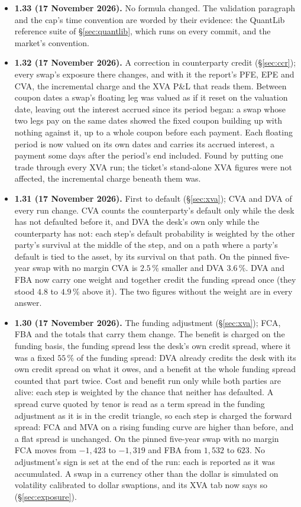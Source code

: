 \documentclass[11pt,a4paper]{article}
\begin{document}
{\begin{itemize}[leftmargin=1.4em, itemsep=4pt]
\item \textbf{1.33 (17 November 2026).} No formula changed. The validation paragraph and the cap's time convention are worded by their evidence: the QuantLib reference suite of \S\ref{sec:quantlib}, which runs on every commit, and the market's convention.
\item \textbf{1.32 (17 November 2026).} A correction in counterparty credit (\S\ref{sec:ccr}); every swap's exposure there changes, and with it the report's PFE, EPE and CVA, the incremental charge and the XVA P\&L that reads them. Between coupon dates a swap's floating leg was valued as if it reset on the valuation date, leaving out the interest accrued since its period began: a swap whose two legs pay on the same dates showed the fixed coupon building up with nothing against it, up to a whole coupon before each payment. Each floating period is now valued on its own dates and carries its accrued interest, a payment some days after the period's end included. Found by putting one trade through every XVA run; the ticket's stand-alone XVA figures were not affected, the incremental charge beneath them was.
\item \textbf{1.31 (17 November 2026).} First to default (\S\ref{sec:xva}); CVA and DVA of every run change. CVA counts the counterparty's default only while the desk has not defaulted before it, and DVA the desk's own only while the counterparty has not: each step's default probability is weighted by the other party's survival at the middle of the step, and on a path where a party's default is tied to the asset, by its survival on that path. On the pinned five-year swap with no margin CVA is $2.5\,\%$ smaller and DVA $3.6\,\%$. DVA and FBA now carry one weight and together credit the funding spread once (they stood $4.8$ to $4.9\,\%$ above it). The two figures without the weight are in every answer.
\item \textbf{1.30 (17 November 2026).} The funding adjustment (\S\ref{sec:xva}); FCA, FBA and the totals that carry them change. The benefit is charged on the funding basis, the funding spread less the desk's own credit spread, where it was a fixed $55\,\%$ of the funding spread: DVA already credits the desk with its own credit spread on what it owes, and a benefit at the whole funding spread counted that part twice. Cost and benefit run only while both parties are alive: each step is weighted by the chance that neither has defaulted. A spread curve quoted by tenor is read as a term spread in the funding adjustment as it is in the credit triangle, so each step is charged the forward spread: FCA and MVA on a rising funding curve are higher than before, and a flat spread is unchanged. On the pinned five-year swap with no margin FCA moves from $-1{,}423$ to $-1{,}319$ and FBA from $1{,}532$ to $623$. No adjustment's sign is set at the end of the run: each is reported as it was accumulated. A swap in a currency other than the dollar is simulated on volatility calibrated to dollar swaptions, and its XVA tab now says so (\S\ref{sec:exposure}).

\end{itemize}}
\end{document}
